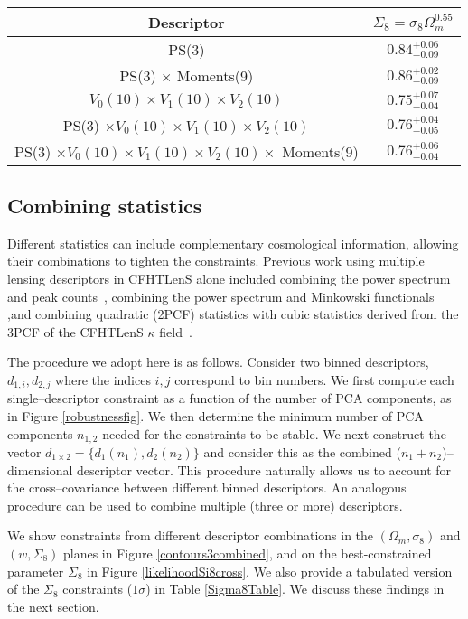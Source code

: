 \documentclass[reprint,aps,prd,superscriptaddress,showkeys,showpacs]{revtex4-1}
\begin{document}
\begin{table*}
\begin{tabular}{c|c}
Descriptor & $\Sigma_8=\sigma_8\Omega_m^{0.55}$ \\ \hline \hline
PS(3) & $0.84^{+0.06}_{-0.09}$\\
PS(3) $\times$ Moments(9) & $0.86^{+0.02}_{-0.09}$ \\
$V_0(10)\times V_1(10) \times V_2(10)$  & $0.75^{+0.07}_{-0.04}$ \\
PS(3) $\times V_0(10)\times V_1(10) \times V_2(10)$ & $0.76^{+0.04}_{-0.05}$ \\
PS(3) $\times V_0(10)\times V_1(10) \times V_2(10) \times$ Moments(9) & $0.76^{+0.06}_{-0.04}$ \\ \hline
\end{tabular}
\caption{Tabulated values of $1\sigma$ constraints on $\Sigma_8$ corresponding to Figure \ref{likelihoodSi8cross}}
\label{Sigma8Table}
\end{table*}

\subsection{Combining statistics}

Different statistics can include complementary cosmological
information, allowing their combinations to tighten the
constraints. Previous work using multiple lensing descriptors in
CFHTLenS alone included combining the power spectrum and peak
counts~\citep{Companion}, combining the power spectrum and Minkowski functionals ~\citep{CFHTMasato} ,and combining quadratic (2PCF) statistics
with cubic statistics derived from the 3PCF of the CFHTLenS $\kappa$ field~\citep{CFHTFu}.

The procedure we adopt here is as follows. Consider two binned
descriptors, $d_{1,i},d_{2,j}$ where the indices $i,j$ correspond to
bin numbers.  We first compute each single--descriptor constraint as a
function of the number of PCA components, as in Figure
\ref{robustnessfig}. We then determine the minimum number of PCA
components $n_{1,2}$ needed for the constraints to be stable. We next
construct the vector $d_{1\times2} = \{d_1(n_1),d_2(n_2)\}$ and
consider this as the combined ($n_1+n_2$)--dimensional descriptor
vector. This procedure naturally allows us to account for the
cross--covariance between different binned descriptors. An analogous
procedure can be used to combine multiple (three or more)
descriptors. 


We show constraints from different descriptor combinations in the
$(\Omega_m,\sigma_8)$ and $(w,\Sigma_8)$ planes in Figure
\ref{contours3combined}, and on the best-constrained parameter
$\Sigma_8$ in Figure \ref{likelihoodSi8cross}. We also provide a tabulated version of the $\Sigma_8$ constraints ($1\sigma$) in Table \ref{Sigma8Table}. We discuss these findings in the next section.
\end{document}
